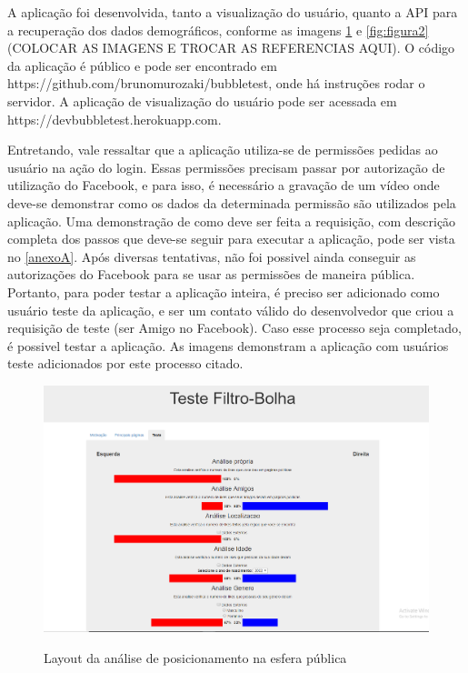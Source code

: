 \documentclass[
	12pt,				%
	oneside,			%
	a4paper,			%
	english,			%
	brazil				%
	]{abntex2ppgsi}
\begin{document}
A aplicação foi desenvolvida, tanto a visualização do usuário, quanto a API para a recuperação dos dados demográficos, conforme as imagens \ref{fig:figura1} e \ref{fig:figura2} (COLOCAR AS IMAGENS E TROCAR AS REFERENCIAS AQUI). O código da aplicação é público e pode ser encontrado em https://github.com/brunomurozaki/bubbletest, onde há instruções rodar o servidor. A aplicação de visualização do usuário pode ser acessada em https://devbubbletest.herokuapp.com.

Entretando, vale ressaltar que a aplicação utiliza-se de permissões pedidas ao usuário na ação do login. Essas permissões precisam passar por autorização de utilização do Facebook, e para isso, é necessário a gravação de um vídeo onde deve-se demonstrar como os dados da determinada permissão são utilizados pela aplicação. Uma demonstração de como deve ser feita a requisição, com descrição completa dos passos que deve-se seguir para executar a aplicação, pode ser vista no \ref{anexoA}. Após diversas tentativas, não foi possivel ainda conseguir as autorizações do Facebook para se usar as permissões de maneira pública. Portanto, para poder testar a aplicação inteira, é preciso ser adicionado como usuário teste da aplicação, e ser um contato válido do desenvolvedor que criou a requisição de teste (ser Amigo no Facebook). Caso esse processo seja completado, é possivel testar a aplicação. As imagens demonstram a aplicação com usuários teste adicionados por este processo citado.

\begin{figure}[H]
	\centering
	\caption{Layout da análise de posicionamento na esfera pública}
	\includegraphics[scale=0.4]{figura1.png}
	\label{fig:figura1}
\end{figure}
\end{document}
